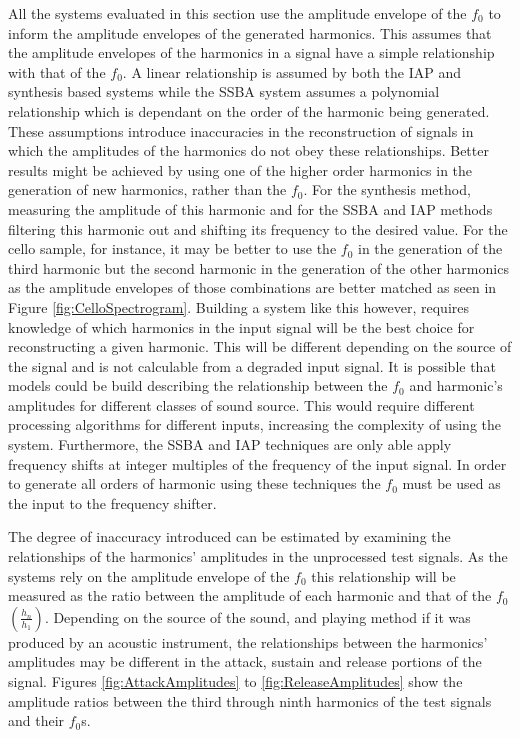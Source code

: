 		All the systems evaluated in this section use the amplitude envelope of the $f_{0}$ to inform the amplitude
		envelopes of the generated harmonics. This assumes that the amplitude envelopes of the harmonics in a
		signal have a simple relationship with that of the $f_{0}$. A linear relationship is assumed by both the
		IAP and synthesis based systems while the SSBA system assumes a polynomial relationship which is dependant
		on the order of the harmonic being generated. These assumptions introduce inaccuracies in the
		reconstruction of signals in which the amplitudes of the harmonics do not obey these relationships. Better
		results might be achieved by using one of the higher order harmonics in the generation of new harmonics,
		rather than the $f_{0}$. For the synthesis method, measuring the amplitude of this harmonic and for the
		SSBA and IAP methods filtering this harmonic out and shifting its frequency to the desired value. For the
		cello sample, for instance, it may be better to use the $f_{0}$ in the generation of the third harmonic but
		the second harmonic in the generation of the other harmonics as the amplitude envelopes of those
		combinations are better matched as seen in Figure \ref{fig:CelloSpectrogram}. Building a system like this
		however, requires knowledge of which harmonics in the input signal will be the best choice for
		reconstructing a given harmonic. This will be different depending on the source of the signal and is not
		calculable from a degraded input signal. It is possible that models could be build describing the
		relationship between the $f_{0}$ and harmonic's amplitudes for different classes of sound source. This
		would require different processing algorithms for different inputs, increasing the complexity of using the
		system. Furthermore, the SSBA and IAP techniques are only able apply frequency shifts at integer multiples
		of the frequency of the input signal. In order to generate all orders of harmonic using these techniques
		the $f_{0}$ must be used as the input to the frequency shifter.
		
		The degree of inaccuracy introduced can be estimated by examining the relationships of the harmonics'
		amplitudes in the unprocessed test signals. As the systems rely on the amplitude envelope of the $f_{0}$
		this relationship will be measured as the ratio between the amplitude of each harmonic and that of the
		$f_{0}$ $\left(\frac{h_{n}}{h_{1}}\right)$. Depending on the source of the sound, and playing method if
		it was produced by an acoustic instrument, the relationships between the harmonics' amplitudes may be
		different in the attack, sustain and release portions of the signal. Figures \ref{fig:AttackAmplitudes} to
		\ref{fig:ReleaseAmplitudes} show the amplitude ratios between the third through ninth harmonics of the test
		signals and their $f_{0}$s.


